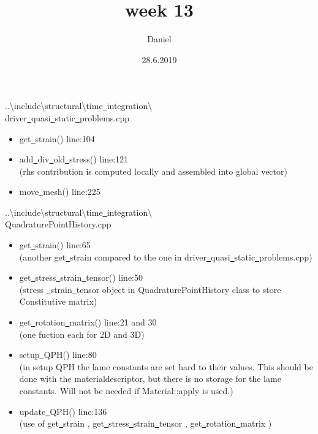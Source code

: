 \documentclass[11pt]{beamer}
\author{Daniel}
\title{week 13}
\date{28.6.2019}
\begin{document}

\begin{frame}
\titlepage
\end{frame}

\begin{frame}{..\textbackslash include\textbackslash structural\textbackslash time\underline{\ }integration\textbackslash \\driver\underline{\ }quasi\underline{\ }static\underline{\ }problems.cpp}
\begin{itemize}
\item get\underline{\ }strain() line:104
\item add\underline{\ }div\underline{\ }old\underline{\ }stress() line:121\\
(rhs contribution is computed locally and assembled into global vector)
\item move\underline{\ }mesh() line:225\\
\end{itemize}
 
\end{frame}{..\textbackslash include\textbackslash structural\textbackslash time\underline{\ }integration\textbackslash \\ QuadraturePointHistory.cpp}
\begin{itemize}
\item get\underline{\ }strain() line:65\\ (another get\underline{\ }strain compared to the one in driver\underline{\ }quasi\underline{\ }static\underline{\ }problems.cpp)
\item get\underline{\ }stress\underline{\ }strain\underline{\ }tensor() line:50\\
(stress \underline{\ }strain\underline{\ }tensor object in QuadraturePointHistory class to store Constitutive matrix)
\item get\underline{\ }rotation\underline{\ }matrix() line:21 and 30\\
(one fuction each for 2D and 3D)
\item setup\underline{\ }QPH() line:80\\
(in setup QPH the lame constants are set hard to their values. This should be done with the materialdescriptor, but there is no storage for the lame constants. Will not be needed if Material::apply is used.)
\item update\underline{\ }QPH() line:136\\
(use of get\underline{\ }strain , get\underline{\ }stress\underline{\ }strain\underline{\ }tensor , get\underline{\ }rotation\underline{\ }matrix )
\end{itemize}
\begin{frame}
\end{frame}
\end{document}
